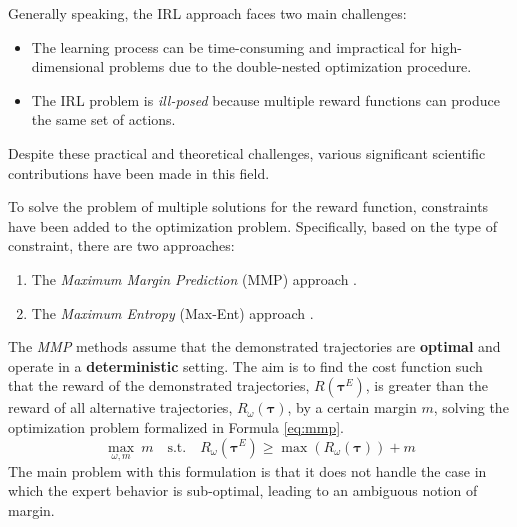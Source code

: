 Generally speaking, the IRL approach faces two main challenges:
\begin{itemize}
    \item The learning process can be time-consuming and impractical for high-dimensional problems due to the double-nested optimization procedure.
    \item The IRL problem is \textit{ill-posed} because multiple reward functions can produce the same set of actions.
\end{itemize}

Despite these practical and theoretical challenges, various significant scientific contributions have been made in this field.

To solve the problem of multiple solutions for the reward function, constraints have been added to the optimization problem. Specifically, based on the type of constraint, there are two approaches:
\begin{enumerate}[label=\textbf{(\alph*)}]
    \item The \textit{Maximum Margin Prediction} (MMP) approach \cite{ratliff2006maximum_margin,ratliff2009learning_to_search}.
    \item The \textit{Maximum Entropy} (Max-Ent) approach \cite{ziebart2008maximum_entropy,wulfmeier2015deep_inverse_rl,finn2016guided_cost_learning}.
\end{enumerate}

The \textit{MMP} methods assume that the demonstrated trajectories are \textbf{optimal} and operate in a \textbf{deterministic} setting. The aim is to find the cost function such that the reward of the demonstrated trajectories, $R(\boldsymbol{\tau}^{E})$, is greater than the reward of all alternative trajectories, $R_{\omega}(\boldsymbol{\tau})$, by a certain margin $m$, solving the optimization problem formalized in Formula \ref{eq:mmp}.
\begin{equation}
\label{eq:mmp}
\underset{\omega, m}{\max} \ m \quad \text{s.t.} \quad R_{\omega}(\boldsymbol{\tau}^{E}) \geq \max (R_{\omega}(\boldsymbol{\tau})) + m
\end{equation}
The main problem with this formulation is that it does not handle the case in which the expert behavior is sub-optimal, leading to an ambiguous notion of margin.


